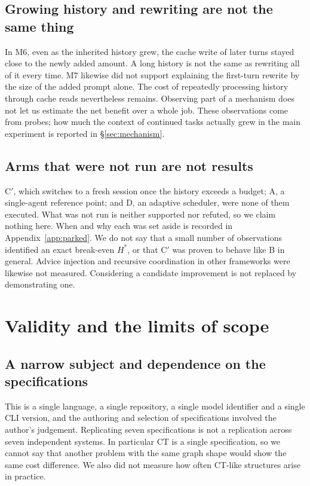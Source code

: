 \documentclass[a4paper,11pt]{article}
\begin{document}
\subsection{Growing history and rewriting are not the same thing}
In M6, even as the inherited history grew, the cache write of later turns stayed close to the newly added amount. A long history is not the same as rewriting all of it every time. M7 likewise did not support explaining the first-turn rewrite by the size of the added prompt alone. The cost of repeatedly processing history through cache reads nevertheless remains. Observing part of a mechanism does not let us estimate the net benefit over a whole job. These observations come from probes; how much the context of continued tasks actually grew in the main experiment is reported in \S\ref{sec:mechanism}.

\subsection{Arms that were not run are not results}
C$'$, which switches to a fresh session once the history exceeds a budget; A, a single-agent reference point; and D, an adaptive scheduler, were none of them executed. What was not run is neither supported nor refuted, so we claim nothing here. When and why each was set aside is recorded in Appendix~\ref{app:parked}. We do not say that a small number of observations identified an exact break-even $H^*$, or that C$'$ was proven to behave like B in general. Advice injection and recursive coordination in other frameworks were likewise not measured. Considering a candidate improvement is not replaced by demonstrating one.

\section{Validity and the limits of scope}\label{sec:limits}
\subsection{A narrow subject and dependence on the specifications}
This is a single language, a single repository, a single model identifier and a single CLI version, and the authoring and selection of specifications involved the author's judgement. Replicating seven specifications is not a replication across seven independent systems. In particular CT is a single specification, so we cannot say that another problem with the same graph shape would show the same cost difference. We also did not measure how often CT-like structures arise in practice.
\end{document}
